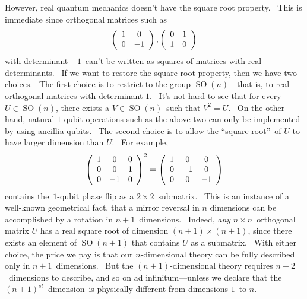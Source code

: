 \documentclass[12pt]{article}%
\begin{document}
However, real quantum mechanics doesn't have the square root property. \ This
is immediate since orthogonal matrices such as%
\[
\left(
\begin{array}
[c]{cc}%
1 & 0\\
0 & -1
\end{array}
\right)  ,\left(
\begin{array}
[c]{cc}%
0 & 1\\
1 & 0
\end{array}
\right)
\]
with determinant $-1$\ can't be written as squares of matrices with real
determinants. \ If we want to restore the square root property, then we have
two choices. \ The first choice is to restrict to the group
$\operatorname*{SO}\left(  n\right)  $---that is, to real orthogonal matrices
with determinant $1$. \ It's not hard to see that for every $U\in
\operatorname*{SO}\left(  n\right)  $, there exists a $V\in\operatorname*{SO}%
\left(  n\right)  $\ such that $V^{2}=U$. \ On the other hand, natural
$1$-qubit operations such as the above two can only be implemented by using
ancillia qubits. \ The second choice is to allow the \textquotedblleft square
root\textquotedblright\ of $U$ to have larger dimension than $U$. \ For
example, \
\[
\left(
\begin{array}
[c]{ccc}%
1 & 0 & 0\\
0 & 0 & 1\\
0 & -1 & 0
\end{array}
\right)  ^{2}=\left(
\begin{array}
[c]{ccc}%
1 & 0 & 0\\
0 & -1 & 0\\
0 & 0 & -1
\end{array}
\right)
\]
contains the\ $1$-qubit phase flip as a $2\times2$\ submatrix. \ This is an
instance of a well-known geometrical fact, that a mirror reversal in $n$
dimensions can be accomplished by a rotation in $n+1$\ dimensions. \ Indeed,
\textit{any} $n\times n$\ orthogonal matrix $U$ has a real square root of
dimension $\left(  n+1\right)  \times\left(  n+1\right)  $, since there exists
an element of $\operatorname*{SO}\left(  n+1\right)  $ that contains $U$ as a
submatrix. \ With either choice, the price we pay is that our $n$-dimensional
theory can be fully described only in $n+1$\ dimensions. \ But the $\left(
n+1\right)  $-dimensional theory requires $n+2$\ dimensions to describe, and
so on ad infinitum---unless we declare that the $\left(  n+1\right)  ^{st}%
$\ dimension\ is physically different from dimensions $1$\ to $n$.
\end{document}
